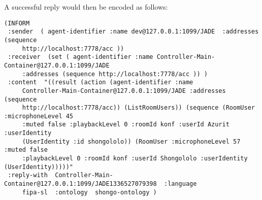 A successful reply would then be encoded as follows:
\begin{verbatim}
(INFORM
 :sender  ( agent-identifier :name dev@127.0.0.1:1099/JADE  :addresses (sequence
     http://localhost:7778/acc ))
 :receiver  (set ( agent-identifier :name Controller-Main-Container@127.0.0.1:1099/JADE
     :addresses (sequence http://localhost:7778/acc )) )
 :content  "((result (action (agent-identifier :name
     Controller-Main-Container@127.0.0.1:1099/JADE :addresses (sequence
     http://localhost:7778/acc)) (ListRoomUsers)) (sequence (RoomUser :microphoneLevel 45
     :muted false :playbackLevel 0 :roomId konf :userId Azurit :userIdentity
     (UserIdentity :id shongololo)) (RoomUser :microphoneLevel 57 :muted false
     :playbackLevel 0 :roomId konf :userId Shongololo :userIdentity (UserIdentity)))))"
 :reply-with  Controller-Main-Container@127.0.0.1:1099/JADE1336527079398  :language
     fipa-sl  :ontology  shongo-ontology )
\end{verbatim}

